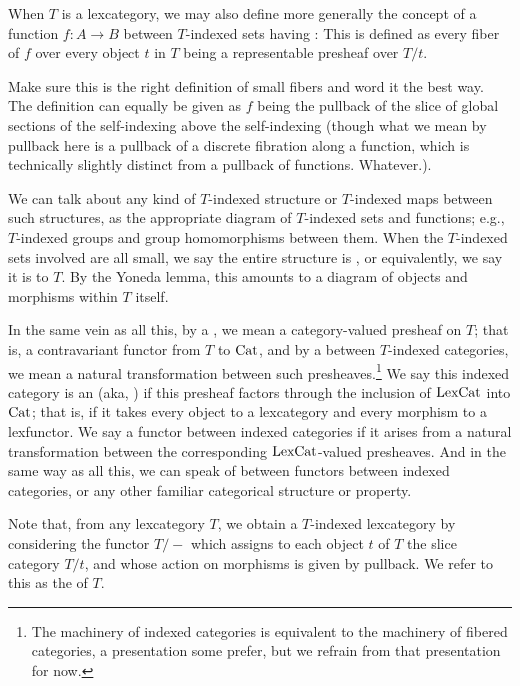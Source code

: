 When $T$ is a lexcategory, we may also define more generally the concept of a function $f : A \to B$ between $T$-indexed sets having : This is defined as every fiber of $f$ over every object $t$ in $T$ being a representable presheaf over $T/t$.

\begin{TODOblock}
Make sure this is the right definition of small fibers and word it the best way. The definition can equally be given as $f$ being the pullback of the slice of global sections of the self-indexing above the self-indexing (though what we mean by pullback here is a pullback of a discrete fibration along a function, which is technically slightly distinct from a pullback of functions. Whatever.).
\end{TODOblock}

We can talk about any kind of $T$-indexed structure or $T$-indexed maps between such structures, as the appropriate diagram of $T$-indexed sets and functions; e.g., $T$-indexed groups and group homomorphisms between them. When the $T$-indexed sets involved are all small, we say the entire structure is , or equivalently, we say it is  to $T$. By the Yoneda lemma, this amounts to a diagram of objects and morphisms within $T$ itself.

In the same vein as all this, by a , we mean a category-valued presheaf on $T$; that is, a contravariant functor from $T$ to $\mathrm{Cat}$, and by a  between $T$-indexed categories, we mean a natural transformation between such presheaves.\footnote{The machinery of indexed categories is equivalent to the machinery of fibered categories, a presentation some prefer, but we refrain from that presentation for now.} We say this indexed category is an  (aka, ) if this presheaf factors through the inclusion of $\mathrm{LexCat}$ into $\mathrm{Cat}$; that is, if it takes every object to a lexcategory and every morphism to a lexfunctor. We say a functor between indexed categories  if it arises from a natural transformation between the corresponding $\mathrm{LexCat}$-valued presheaves. And in the same way as all this, we can speak of  between functors between indexed categories, or any other familiar categorical structure or property.

Note that, from any lexcategory $T$, we obtain a $T$-indexed lexcategory by considering the functor $T/-$ which assigns to each object $t$ of $T$ the slice category $T/t$, and whose action on morphisms is given by pullback. We refer to this as the  of $T$.

